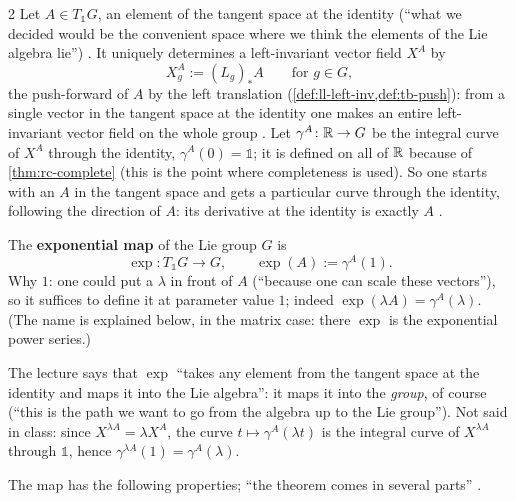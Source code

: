 \begin{paracol}{2}
Let $A\in T_{\mathbb 1}G$, an element of the tangent space at the identity (``what we decided would be the convenient space where we think the elements of the Lie algebra lie'') . It uniquely determines a left-invariant vector field $X^A$ by
\[
  X^A_g:=(L_g)_*A\qquad\text{for }g\in G ,
\]
the push-forward of $A$ by the left translation (\cref{def:ll-left-inv,def:tb-push}): from a single vector in the tangent space at the identity one makes an entire left-invariant vector field on the whole group   . Let $\gamma^A\colon\mathbb{R}\to G$ be the integral curve of $X^A$ through the identity, $\gamma^A(0)=\mathbb 1$; it is defined on all of $\mathbb{R}$ because of \cref{thm:rc-complete} (this is the point where completeness is used). So one starts with an $A$ in the tangent space and gets a particular curve through the identity, following the direction of $A$: its derivative at the identity is exactly $A$     .
\begin{definition}\label{def:rc-exp}
The \textbf{exponential map} of the Lie group $G$ is
\[
  \exp\colon T_{\mathbb 1}G\to G,\qquad\exp(A):=\gamma^A(1) .
\]
Why $1$: one could put a $\lambda$ in front of $A$ (``because one can scale these vectors''), so it suffices to define it at parameter value $1$; indeed $\exp(\lambda A)=\gamma^A(\lambda)$. (The name is explained below, in the matrix case: there $\exp$ is the exponential power series.)    
\end{definition}
\begin{coursenote}[A slip, and why $\exp(\lambda A)=\gamma^A(\lambda)$]
The lecture says that $\exp$ ``takes any element from the tangent space at the identity and maps it into the Lie algebra'': it maps it into the \emph{group}, of course (``this is the path we want to go from the algebra up to the Lie group''). Not said in class: since $X^{\lambda A}=\lambda X^A$, the curve $t\mapsto\gamma^A(\lambda t)$ is the integral curve of $X^{\lambda A}$ through $\mathbb 1$, hence $\gamma^{\lambda A}(1)=\gamma^A(\lambda)$. 
\end{coursenote}
The map has the following properties; ``the theorem comes in several parts'' .
\begin{theorem}\label{thm:rc-exp}
\begin{enumerate}

\end{enumerate}
\end{theorem}
\end{paracol}
